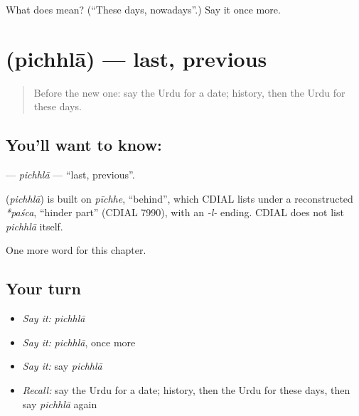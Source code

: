 \begin{tcolorbox}[breakable,colback=teal!4,colframe=teal!35!black,title={Before you move on}]
What does  mean? (\textquotedblleft{}These days, nowadays\textquotedblright{}.) Say it once more.
\end{tcolorbox}
\section[\texorpdfstring{\ur{پچھلا} (pichhlā)}{پچھلا (pichhlā)}]{ (pichhlā) — last, previous}

\label{lesson:UR-C95-pichhla}



\begin{quote}
Before the new one: say the Urdu for a date; history, then the Urdu for these days.
\end{quote}

\subsection*{You'll want to know: }
\textbf{} — \emph{pichhlā} — \textquotedblleft{}last, previous\textquotedblright{}.

\begin{cousinweb}
\textbf{} (\emph{pichhlā}) is built on \emph{pīchhe}, \textquotedblleft{}behind\textquotedblright{}, which CDIAL lists under a reconstructed \emph{*paśca}, \textquotedblleft{}hinder part\textquotedblright{} (CDIAL 7990), with an \emph{-l-} ending. CDIAL does not list \emph{pichhlā} itself.
\end{cousinweb}

\begin{grammarlens}[title={What you've built}]
One more word for this chapter.
\end{grammarlens}

\subsection*{Your turn}
\begin{itemize}
\raggedright
  \item \emph{Say it:} \emph{pichhlā}
  \item \emph{Say it:} \emph{pichhlā}, once more
  \item \emph{Say it:} say \emph{pichhlā}
  \item \emph{Recall:} say the Urdu for a date; history, then the Urdu for these days, then say \emph{pichhlā} again
\end{itemize}

